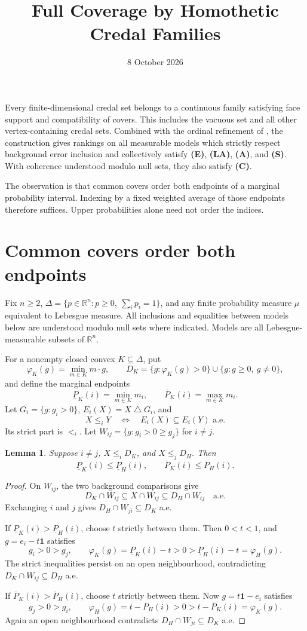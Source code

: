 \documentclass[11pt]{article}
\title{Full Coverage by Homothetic Credal Families}
\author{}
\date{8 October 2026}
\newtheorem{lemma}[theorem]{Lemma}
\theoremstyle{remark}
\newcommand{\R}{\mathbb R}
\newcommand{\one}{\mathbf 1}
\newcommand{\sd}{\mathbin{\triangle}}
\newcommand{\lo}{\underline P}
\newcommand{\hi}{\overline P}
\begin{document}
\maketitle

\noindent
Every finite-dimensional credal set belongs to a continuous family satisfying
face support and compatibility of covers. This includes the vacuous set and
all other vertex-containing credal sets. Combined with the ordinal refinement
of \cite{OR}, the construction gives rankings on all measurable models which
strictly respect background error inclusion and collectively satisfy
\textbf{(E)}, \textbf{(LA)}, \textbf{(A)}, and \textbf{(S)}. With coherence
understood modulo null sets, they also satisfy \textbf{(C)}.

The observation is that common covers order both endpoints of a marginal
probability interval. Indexing by a fixed weighted average of those endpoints
therefore suffices. Upper probabilities alone need not order the indices.

\section{Common covers order both endpoints}

Fix $n\ge2$, $\Delta=\{p\in\R^n:p\ge0,\ \sum_i p_i=1\}$, and any
finite probability measure $\mu$ equivalent to Lebesgue measure. All inclusions
and equalities between models below are understood modulo null sets where
indicated. Models are all Lebesgue-measurable subsets of $\R^n$.

For a nonempty closed convex $K\subseteq\Delta$, put
\[
 \varphi_K(g)=\min_{m\in K}m\cdot g,\qquad
 D_K=\{g:\varphi_K(g)>0\}\cup\{g:g\ge0,\ g\ne0\},
\]
and define the marginal endpoints
\[
 \lo_K(i)=\min_{m\in K}m_i,\qquad
 \hi_K(i)=\max_{m\in K}m_i.
\]
Let $G_i=\{g:g_i>0\}$, $E_i(X)=X\sd G_i$, and
\[
 X\le_iY\quad\Longleftrightarrow\quad
 E_i(X)\subseteq E_i(Y)\text{ a.e.}
\]
Its strict part is $<_i$. Let $W_{ij}=\{g:g_i>0\ge g_j\}$ for $i\ne j$.

\begin{lemma}\label{lem:endpoints}
Suppose $i\ne j$, $X\le_iD_K$, and $X\le_jD_H$. Then
\[
 \lo_K(i)\le\lo_H(i),\qquad
 \hi_K(i)\le\hi_H(i).
 \tag{1}\label{eq:endpoints}
\]
\end{lemma}
\begin{proof}
On $W_{ij}$, the two background comparisons give
\[
 D_K\cap W_{ij}\subseteq X\cap W_{ij}\subseteq D_H\cap W_{ij}
 \quad\text{a.e.}
\]
Exchanging $i$ and $j$ gives $D_H\cap W_{ji}\subseteq D_K$ a.e.

If $\lo_K(i)>\lo_H(i)$, choose $t$ strictly between them. Then $0<t<1$,
and $g=e_i-t\one$ satisfies
\[
 g_i>0>g_j,\qquad
 \varphi_K(g)=\lo_K(i)-t>0>\lo_H(i)-t=\varphi_H(g).
\]
The strict inequalities persist on an open neighbourhood, contradicting
$D_K\cap W_{ij}\subseteq D_H$ a.e.

If $\hi_K(i)>\hi_H(i)$, choose $t$ strictly between them. Now
$g=t\one-e_i$ satisfies
\[
 g_j>0>g_i,\qquad
 \varphi_H(g)=t-\hi_H(i)>0>t-\hi_K(i)=\varphi_K(g).
\]
Again an open neighbourhood contradicts $D_H\cap W_{ji}\subseteq D_K$ a.e.
\end{proof}
\end{document}
